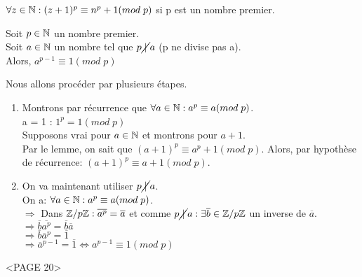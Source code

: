 \begin{lemme}
$\forall z \in \mathbb{N}: (z+1)^p \equiv n^p + 1(mod\;p)$ si p est un nombre premier.
\end{lemme}

\begin{thrm}
Soit $p\in \mathbb{N}$ un nombre premier.\\
Soit $a\in \mathbb{N}$ un nombre tel que $p\cancel{\;|\;}a$ (p ne divise pas a).\\
Alors, $a^{p-1} \equiv 1(mod\;p)$\\
\end{thrm}

\begin{demo}
Nous allons procéder par plusieurs étapes.\\

\begin{enumerate}
	\item Montrons par récurrence que $\forall a \in \mathbb{N}: a^p \equiv a(mod\;p)$.\\
	a = 1 : $1^p = 1(mod\;p)$\\
	Supposons vrai pour $a \in \mathbb{N}$ et montrons pour $a+1$.\\
	Par le lemme, on sait que $(a+1)^p \equiv a^p + 1(mod\;p)$. Alors, par hypothèse de récurrence: $(a+1)^p \equiv a + 1(mod\;p)$.\\
	\item On va maintenant utiliser $p\cancel{\;|\;}a$.\\
	On a: $\forall a \in \mathbb{N}: a^p \equiv a(mod\;p)$.\\
	$\Rightarrow$ Dans $\mathbb{Z}/p\mathbb{Z}: \overline{a^p}=\overline{a}$ et comme $p\cancel{\;|\;}a: \exists \overline{b} \in \mathbb{Z}/p\mathbb{Z}$ un inverse de $\overline{a}$.\\
	$\Rightarrow \overline{b}\overline{a^p} = \overline{b}\overline{a}$\\
	$\Rightarrow \overline{b}\overline{a}^p = \overline{1}$\\
	$\Rightarrow \overline{a}^{p-1} = \overline{1} \Leftrightarrow a^{p-1} \equiv 1(mod\;p)$\\ 

\end{enumerate}
\end{demo}

\begin{demo} [du Lemme]
<PAGE 20>
\end{demo}

